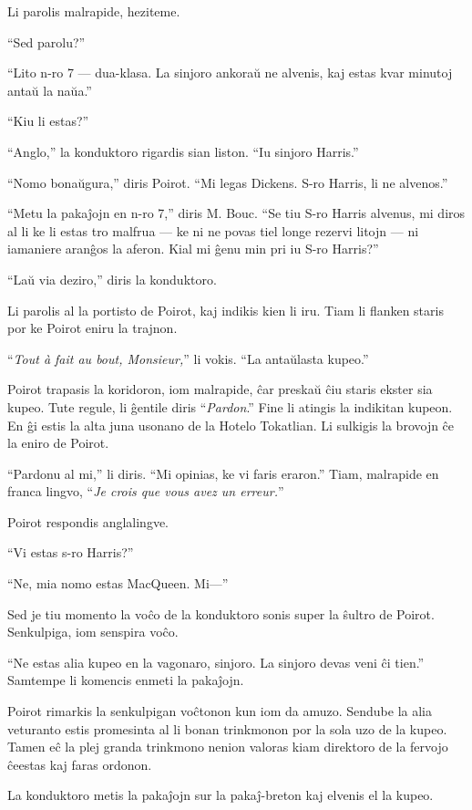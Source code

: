 Li parolis malrapide, heziteme.

``Sed parolu?''

``Lito n-ro 7 --- dua-klasa. La sinjoro ankoraŭ ne alvenis, kaj estas kvar minutoj antaŭ la naŭa.''

``Kiu li estas?''

``Anglo,'' la konduktoro rigardis sian liston. ``Iu sinjoro Harris.''

``Nomo bonaŭgura,'' diris Poirot. ``Mi legas Dickens. S-ro Harris, li ne alvenos.''

``Metu la pakaĵojn en n-ro 7,'' diris M. Bouc. ``Se tiu S-ro Harris alvenus, mi diros al li ke li estas tro malfrua --- ke ni ne povas tiel longe rezervi litojn --- ni iamaniere aranĝos la aferon. Kial mi ĝenu min pri iu S-ro Harris?''

``Laŭ via deziro,'' diris la konduktoro.

Li parolis al la portisto de Poirot, kaj indikis kien li iru. Tiam li flanken staris por ke Poirot eniru la trajnon.

``\emph{Tout à fait au bout, Monsieur,}'' li vokis. ``La antaŭlasta kupeo.''

Poirot trapasis la koridoron, iom malrapide, ĉar preskaŭ ĉiu staris ekster sia kupeo. Tute regule, li ĝentile diris ``\emph{Pardon}.'' Fine li atingis la indikitan kupeon. En ĝi estis la alta juna usonano de la Hotelo Tokatlian. Li sulkigis la brovojn ĉe la eniro de Poirot.

``Pardonu al mi,'' li diris. ``Mi opinias, ke vi faris eraron.'' Tiam, malrapide en franca lingvo, ``\emph{Je crois que vous avez un erreur.}''

Poirot respondis anglalingve.

``Vi estas s-ro Harris?''

``Ne, mia nomo estas MacQueen. Mi---''

Sed je tiu momento la voĉo de la konduktoro sonis super la ŝultro de Poirot. Senkulpiga, iom senspira voĉo.

``Ne estas alia kupeo en la vagonaro, sinjoro. La sinjoro devas veni ĉi tien.'' Samtempe li komencis enmeti la pakaĵojn.

Poirot rimarkis la senkulpigan voĉtonon kun iom da amuzo. Sendube la alia veturanto estis promesinta al li bonan trinkmonon por la sola uzo de la kupeo. Tamen eĉ la plej granda trinkmono nenion valoras kiam direktoro de la fervojo ĉeestas kaj faras ordonon.

La konduktoro metis la pakaĵojn sur la pakaĵ-breton kaj elvenis el la kupeo.

